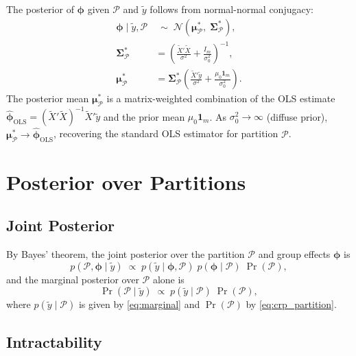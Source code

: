 \documentclass[12pt]{article}
\newcommand{\Normal}{\mathcal{N}}
\newcommand{\1}{\mathbbm{1}}
\newcommand{\ytd}{\tilde{y}}
\newcommand{\Xtd}{\tilde{X}}
\begin{document}
The posterior of $\bm{\phi}$ given $\mathcal{P}$ and $\ytd$ follows from
normal-normal conjugacy:
\begin{align}
  \bm{\phi}\mid\ytd,\mathcal{P} &\;\sim\; \Normal\!\left(\bm{\mu}_{\mathcal{P}}^*,\;\bm{\Sigma}_{\mathcal{P}}^*\right),
  \label{eq:phi_post}\\
  \bm{\Sigma}_{\mathcal{P}}^* &= \left(\frac{\Xtd'\Xtd}{\sigma^2} + \frac{I_m}{\sigma_0^2}\right)^{-1},
  \label{eq:sigma_star}\\
  \bm{\mu}_{\mathcal{P}}^* &= \bm{\Sigma}_{\mathcal{P}}^*\left(\frac{\Xtd'\ytd}{\sigma^2} + \frac{\mu_0\mathbf{1}_m}{\sigma_0^2}\right).
  \label{eq:mu_star}
\end{align}
The posterior mean $\bm{\mu}_{\mathcal{P}}^*$ is a matrix-weighted combination
of the OLS estimate $\hat{\bm{\phi}}_{\mathrm{OLS}} = (\Xtd'\Xtd)^{-1}\Xtd'\ytd$
and the prior mean $\mu_0\mathbf{1}_m$. As $\sigma_0^2\to\infty$ (diffuse prior),
$\bm{\mu}_{\mathcal{P}}^*\to\hat{\bm{\phi}}_{\mathrm{OLS}}$, recovering the
standard OLS estimator for partition $\mathcal{P}$.

\section{Posterior over Partitions}

\subsection{Joint Posterior}

By Bayes' theorem, the joint posterior over the partition $\mathcal{P}$ and
group effects $\bm{\phi}$ is
\begin{equation}
  p(\mathcal{P},\bm{\phi}\mid\ytd) \;\propto\;
    p(\ytd\mid\bm{\phi},\mathcal{P})\;p(\bm{\phi}\mid\mathcal{P})\;\Pr(\mathcal{P}),
\end{equation}
and the marginal posterior over $\mathcal{P}$ alone is
\begin{equation}
  \Pr(\mathcal{P}\mid\ytd) \;\propto\; p(\ytd\mid\mathcal{P})\;\Pr(\mathcal{P}),
  \label{eq:part_post}
\end{equation}
where $p(\ytd\mid\mathcal{P})$ is given by \eqref{eq:marginal} and
$\Pr(\mathcal{P})$ by \eqref{eq:crp_partition}.

\subsection{Intractability}
\end{document}
